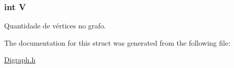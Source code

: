 \subsubsection[{\texorpdfstring{V}{V}}]{\setlength{\rightskip}{0pt plus 5cm}int V}\hypertarget{structdigraph_a91e334f289dc11ba09da0df4a9c72123}{}\label{structdigraph_a91e334f289dc11ba09da0df4a9c72123}
Quantidade de vértices no grafo. 

The documentation for this struct was generated from the following file\+:\begin{DoxyCompactItemize}
\item 
\hyperlink{_digraph_8h}{Digraph.\+h}\end{DoxyCompactItemize}
